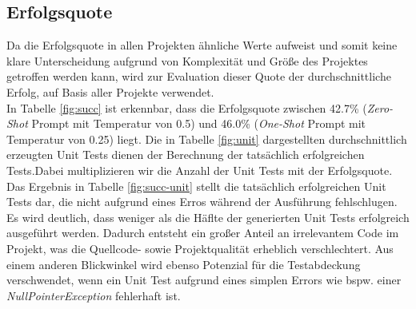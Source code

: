 \subsection{Erfolgsquote}
Da die Erfolgsquote in allen Projekten ähnliche Werte aufweist und somit keine klare Unterscheidung aufgrund von Komplexität und Größe des Projektes getroffen werden kann, wird zur Evaluation dieser Quote der durchschnittliche Erfolg, auf Basis aller Projekte verwendet.\\
In Tabelle \ref{fig:succ} ist erkennbar, dass die Erfolgsquote zwischen 42.7\% (\textit{Zero-Shot} Prompt mit Temperatur von 0.5) und 46.0\% (\textit{One-Shot} Prompt mit Temperatur von 0.25) liegt. Die in Tabelle \ref{fig:unit} dargestellten durchschnittlich erzeugten Unit Tests dienen der Berechnung der tatsächlich erfolgreichen Tests.Dabei multiplizieren wir die Anzahl der Unit Tests mit der Erfolgsquote. Das Ergebnis in Tabelle \ref{fig:succ-unit} stellt die tatsächlich erfolgreichen Unit Tests dar, die nicht aufgrund eines Erros während der Ausführung fehlschlugen.  Es wird deutlich, dass weniger als die Häflte der generierten Unit Tests erfolgreich ausgeführt werden. Dadurch entsteht ein großer Anteil an irrelevantem Code im Projekt, was die Quellcode- sowie Projektqualität erheblich verschlechtert. Aus einem anderen Blickwinkel wird ebenso Potenzial für die Testabdeckung verschwendet, wenn ein Unit Test aufgrund eines simplen Errors wie bspw. einer \textit{NullPointerException} fehlerhaft ist.

